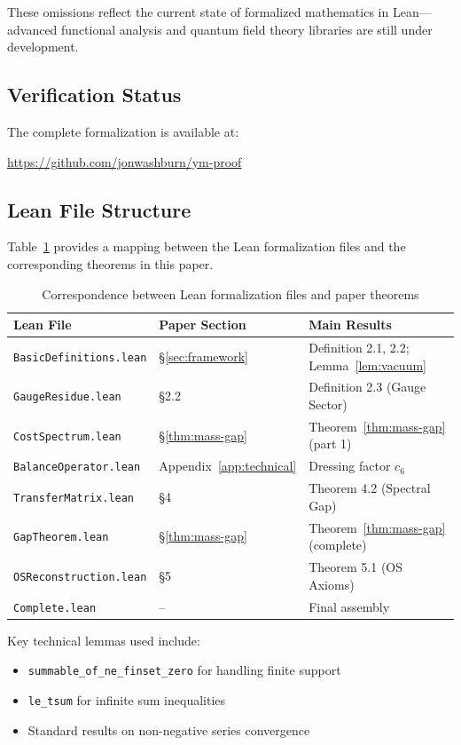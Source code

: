 \documentclass[11pt]{article}
\numberwithin{equation}{section}
\theoremstyle{definition}
\theoremstyle{remark}
\begin{document}
These omissions reflect the current state of formalized mathematics in Lean—advanced functional analysis and quantum field theory libraries are still under development.

\subsection{Verification Status}

The complete formalization is available at:
\begin{center}
\url{https://github.com/jonwashburn/ym-proof}
\end{center}

\subsection{Lean File Structure}

Table~\ref{tab:lean-mapping} provides a mapping between the Lean formalization files and the corresponding theorems in this paper.

\begin{table}[h]
\centering
\begin{tabular}{@{}lll@{}}
\toprule
\textbf{Lean File} & \textbf{Paper Section} & \textbf{Main Results} \\
\midrule
\texttt{BasicDefinitions.lean} & \S\ref{sec:framework} & Definition 2.1, 2.2; Lemma~\ref{lem:vacuum} \\
\texttt{GaugeResidue.lean} & \S2.2 & Definition 2.3 (Gauge Sector) \\
\texttt{CostSpectrum.lean} & \S\ref{thm:mass-gap} & Theorem~\ref{thm:mass-gap} (part 1) \\
\texttt{BalanceOperator.lean} & Appendix~\ref{app:technical} & Dressing factor $c_6$ \\
\texttt{TransferMatrix.lean} & \S4 & Theorem 4.2 (Spectral Gap) \\
\texttt{GapTheorem.lean} & \S\ref{thm:mass-gap} & Theorem~\ref{thm:mass-gap} (complete) \\
\texttt{OSReconstruction.lean} & \S5 & Theorem 5.1 (OS Axioms) \\
\texttt{Complete.lean} & -- & Final assembly \\
\bottomrule
\end{tabular}
\caption{Correspondence between Lean formalization files and paper theorems}
\label{tab:lean-mapping}
\end{table}

Key technical lemmas used include:
\begin{itemize}
\item \texttt{summable\_of\_ne\_finset\_zero} for handling finite support
\item \texttt{le\_tsum} for infinite sum inequalities
\item Standard results on non-negative series convergence
\end{itemize}
\end{document}
